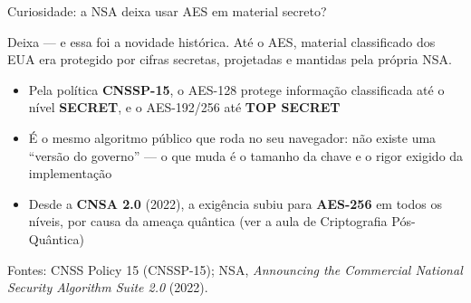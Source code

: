 \documentclass{beamer}
\begin{document}
\begin{frame}{Curiosidade: a NSA deixa usar AES em material secreto?}
    \begin{tcolorbox}[colback=green!6,colframe=green!50!black,boxrule=0.5pt]
        \footnotesize
        Deixa --- e essa foi a novidade histórica. Até o AES, material classificado dos EUA era protegido por cifras secretas, projetadas e mantidas pela própria NSA.
    \end{tcolorbox}
    \medskip
    \begin{itemize}
        \footnotesize
        \item Pela política \textbf{CNSSP-15}, o AES-128 protege informação classificada até o nível \textbf{SECRET}, e o AES-192/256 até \textbf{TOP SECRET}
        \item É o mesmo algoritmo público que roda no seu navegador: não existe uma ``versão do governo'' --- o que muda é o tamanho da chave e o rigor exigido da implementação
        \item Desde a \textbf{CNSA 2.0} (2022), a exigência subiu para \textbf{AES-256} em todos os níveis, por causa da ameaça quântica (ver a aula de Criptografia Pós-Quântica)
    \end{itemize}
    \smallskip
    {\tiny Fontes: CNSS Policy 15 (CNSSP-15); NSA, \textit{Announcing the Commercial National Security Algorithm Suite 2.0} (2022).\par}
\end{frame}

\end{document}
